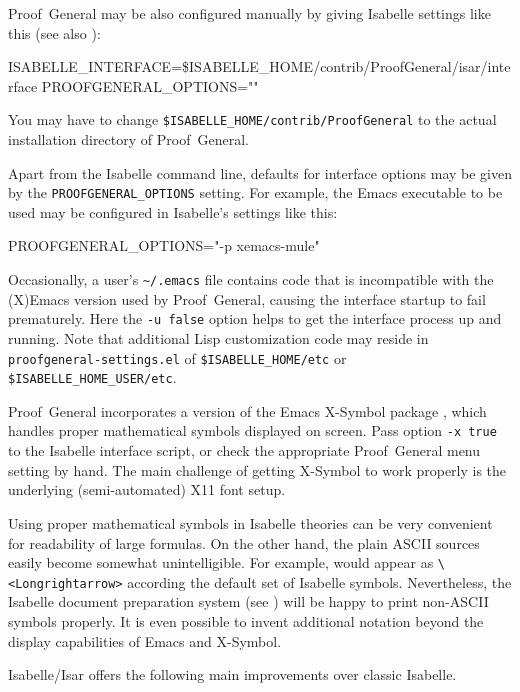 \begin{isabellebody}
\begin{isamarkuptext}
  \medskip Proof~General may be also configured manually by giving
  Isabelle settings like this (see also \cite{isabelle-sys}):

\begin{ttbox}
ISABELLE_INTERFACE=\$ISABELLE_HOME/contrib/ProofGeneral/isar/interface
PROOFGENERAL_OPTIONS=""
\end{ttbox}
  You may have to change \verb|$ISABELLE_HOME/contrib/ProofGeneral| to the actual installation
  directory of Proof~General.

  \medskip Apart from the Isabelle command line, defaults for
  interface options may be given by the \texttt{PROOFGENERAL_OPTIONS}
  setting.  For example, the Emacs executable to be used may be
  configured in Isabelle's settings like this:
\begin{ttbox}
PROOFGENERAL_OPTIONS="-p xemacs-mule"  
\end{ttbox}

  Occasionally, a user's \verb|~/.emacs| file contains code
  that is incompatible with the (X)Emacs version used by
  Proof~General, causing the interface startup to fail prematurely.
  Here the \texttt{-u false} option helps to get the interface process
  up and running.  Note that additional Lisp customization code may
  reside in \texttt{proofgeneral-settings.el} of \verb|$ISABELLE_HOME/etc| or \verb|$ISABELLE_HOME_USER/etc|.%
\end{isamarkuptext}%
\isamarkuptrue%
%
\isamarkuptrue%
%
\begin{isamarkuptext}%
Proof~General incorporates a version of the Emacs X-Symbol package
  \cite{x-symbol}, which handles proper mathematical symbols displayed
  on screen.  Pass option \texttt{-x true} to the Isabelle interface
  script, or check the appropriate Proof~General menu setting by hand.
  The main challenge of getting X-Symbol to work properly is the
  underlying (semi-automated) X11 font setup.

  \medskip Using proper mathematical symbols in Isabelle theories can
  be very convenient for readability of large formulas.  On the other
  hand, the plain ASCII sources easily become somewhat unintelligible.
  For example, \isa{{\isasymLongrightarrow}} would appear as \verb|\<Longrightarrow>| according
  the default set of Isabelle symbols.  Nevertheless, the Isabelle
  document preparation system (see ) will be
  happy to print non-ASCII symbols properly.  It is even possible to
  invent additional notation beyond the display capabilities of Emacs
  and X-Symbol.%
\end{isamarkuptext}%
\isamarkuptrue%
%
\isamarkuptrue%
%
\begin{isamarkuptext}%
Isabelle/Isar offers the following main improvements over classic
  Isabelle.


\end{isamarkuptext}
\end{isabellebody}
